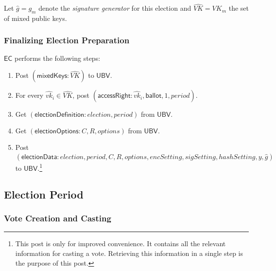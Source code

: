 \documentclass[bibtotoc,halfparskip,oneside]{scrreprt}
\newcommand{\descrElection}{\mathit{election}\xspace}
\newcommand{\descrOptions}{\mathit{options}\xspace}
\newcommand{\period}{\mathit{period}\xspace}
\newcommand{\vkhat}[1]{\hat{\mathit{vk}}_{#1}\xspace}
\newcommand{\EC}{\ensuremath{\mathsf{EC}}\xspace}
\newcommand{\UBV}{\ensuremath{\mathsf{UBV}}\xspace}
\begin{document}
Let $\hat{g}=g_m$ denote the \emph{signature generator} for this election and $\hat{\mathit{VK}}=\mathit{VK}_m$ the set of mixed public keys. 

\subsubsection{Finalizing Election Preparation}

\EC performs the following steps:
\begin{enumerate}
	\item Post $(\mathsf{mixedKeys}:\hat{\mathit{VK}})$ to \UBV.
	\item For every $\vkhat{i}\in \hat{\mathit{VK}}$, post $(\mathsf{accessRight}:\vkhat{i}, \mathsf{ballot}, 1,\period)$.
	\item Get $(\mathsf{electionDefinition}: \descrElection,\period)$ from \UBV.
	\item Get $(\mathsf{electionOptions}:C,R,\descrOptions)$ from \UBV.
	\item Post $(\mathsf{electionData}:\descrElection, \period, C, R, \descrOptions, \mathit{encSetting},\mathit{sigSetting},\mathit{hashSetting},y, \hat{g})$ to \UBV.\footnote{This post is only for improved convenience. It contains all the relevant information for casting a vote. Retrieving this information in a single step is the purpose of this post.}
\end{enumerate}

\subsection{Election Period}\label{election_period}

\subsubsection{Vote Creation and Casting}
\end{document}
